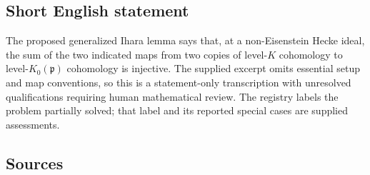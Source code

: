 \documentclass[11pt]{article}
\begin{document}
\subsection{Short English statement}
The proposed generalized Ihara lemma says that, at a non-Eisenstein Hecke ideal, the sum of the two indicated maps from two copies of level-\(K\) cohomology to level-\(K_0(\mathfrak p)\) cohomology is injective. The supplied excerpt omits essential setup and map conventions, so this is a statement-only transcription with unresolved qualifications requiring human mathematical review. The registry labels the problem partially solved; that label and its reported special cases are supplied assessments.
\subsection{Sources}
\end{document}
